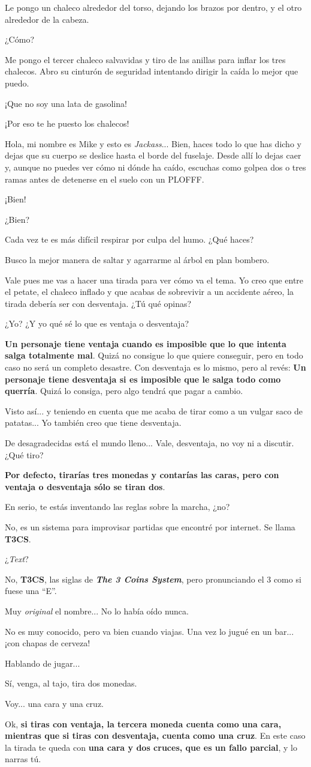 \documentclass[10pt, a5paper, twocolumn]{article}
\newenvironment{dialogue}
    {\begin{description}[leftmargin=!,align=right,labelwidth=0.cm]}
    {\end{description}}
\newcommand\A{\item[\raisebox{-0.25em}{\scalebox{0.75}{\bctetraedre}}]}
\newcommand\B{\item[\raisebox{-0.25em}{\scalebox{0.75}{\bccube}}]}
\newcommand\E{\item[\raisebox{-0.25em}{\scalebox{0.75}{\bcicosaedre}}]}
\begin{document}
\begin{dialogue}
        \B Le pongo un chaleco alrededor del torso, dejando los brazos por dentro, y el otro alrededor de la cabeza.
        \A ¿Cómo?
        \B Me pongo el tercer chaleco salvavidas y tiro de las anillas para inflar los tres chalecos. Abro su cinturón de seguridad intentando dirigir la caída lo mejor que puedo.
        \A ¡Que no soy una lata de gasolina!
        \B ¡Por eso te he puesto los chalecos!
        \E Hola, mi nombre es Mike y esto es \emph{Jackass}... Bien, haces todo lo que has dicho y dejas que su cuerpo se deslice hasta el borde del fuselaje. Desde allí lo dejas caer y, aunque no puedes ver cómo ni dónde ha caído, escuchas como golpea dos o tres ramas antes de detenerse en el suelo con un PLOFFF.
        \B ¡Bien!
        \A ¿Bien?
        \E Cada vez te es más difícil respirar por culpa del humo. ¿Qué haces?
        \B Busco la mejor manera de saltar y agarrarme al árbol en plan bombero.
        \E Vale pues me vas a hacer una tirada para ver cómo va el tema. Yo creo que entre el petate, el chaleco inflado y que acabas de sobrevivir a un accidente aéreo, la tirada debería ser con desventaja. ¿Tú qué opinas?
        \A ¿Yo? ¿Y yo qué sé lo que es ventaja o desventaja?
        \E \textbf{Un personaje tiene ventaja cuando es imposible que lo que intenta salga totalmente mal}. Quizá no consigue lo que quiere conseguir, pero en todo caso no será un completo desastre. Con desventaja es lo mismo, pero al revés: \textbf{Un personaje tiene desventaja si es imposible que le salga todo como querría}. Quizá lo consiga, pero algo tendrá que pagar a cambio.
        \A Visto así... y teniendo en cuenta que me acaba de tirar como a un vulgar saco de patatas... Yo también creo que tiene desventaja.
        \B De desagradecidas está el mundo lleno... Vale, desventaja, no voy ni a discutir. ¿Qué tiro?
        \E \textbf{Por defecto, tirarías tres monedas y contarías las caras, pero con ventaja o desventaja sólo se tiran dos}.
        \B En serio, te estás inventando las reglas sobre la marcha, ¿no?
        \E No, es un sistema para improvisar partidas que encontré por internet. Se llama \textbf{T3CS}.
        \B ¿\emph{Text}?
        \E No, \textbf{T3CS}, las siglas de \emph{\textbf{The 3 Coins System}}, pero pronunciando el 3 como si fuese una ``E''.
        \B Muy \emph{original} el nombre... No lo había oído nunca.
        \E No es muy conocido, pero va bien cuando viajas. Una vez lo jugué en un bar... ¡con chapas de cerveza!
        \A Hablando de jugar...
        \E Sí, venga, al tajo, tira dos monedas.
        \B Voy... una cara y una cruz.
        \E Ok, \textbf{si tiras con ventaja, la tercera moneda cuenta como una cara, mientras que si tiras con desventaja, cuenta como una cruz}. En este caso la tirada te queda con \textbf{una cara y dos cruces, que es un fallo parcial}, y lo narras tú.

\end{dialogue}
\end{document}

